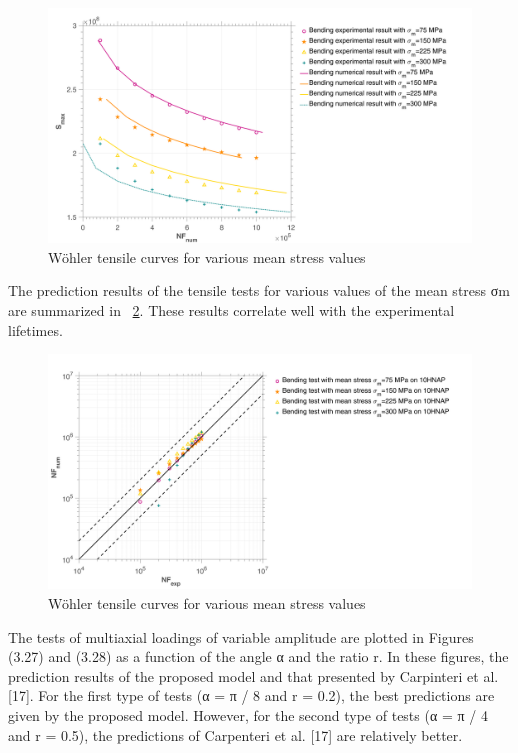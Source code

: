 \documentclass[3p,times,number,review]{elsarticle}
\newcommand{\figref}[1]{\figurename~\ref{#1}}
\begin{document}
\begin{figure}[!h]
	\centering
	\includegraphics[width=\textwidth]{figures//b1D_m_10HNAP_sn.png} 
	\caption{Wöhler tensile curves for various mean stress values}
	\label{fig.b1Dm10HNAPsn}
\end{figure}
The prediction results of the tensile tests for various values of the mean stress σm are summarized in \figref{fig.b1Dm10HNAPerr1}. These results correlate well with the experimental lifetimes. 
\begin{figure}[!h]
	\centering
	\includegraphics[width=\textwidth]{figures//b1D_m_10HNAP_err1.png} 
	\caption{Wöhler tensile curves for various mean stress values}
	\label{fig.b1Dm10HNAPerr1}
\end{figure}
The tests of multiaxial loadings of variable amplitude are plotted in Figures (3.27) and (3.28) as a function of the angle α and the ratio r. In these figures, the prediction results of the proposed model and that presented by Carpinteri et al. [17]. For the first type of tests (α = π / 8 and r = 0.2), the best predictions are given by the proposed model.
However, for the second type of tests (α = π / 4 and r = 0.5), the predictions of Carpenteri et al. [17] are relatively better.
\end{document}
